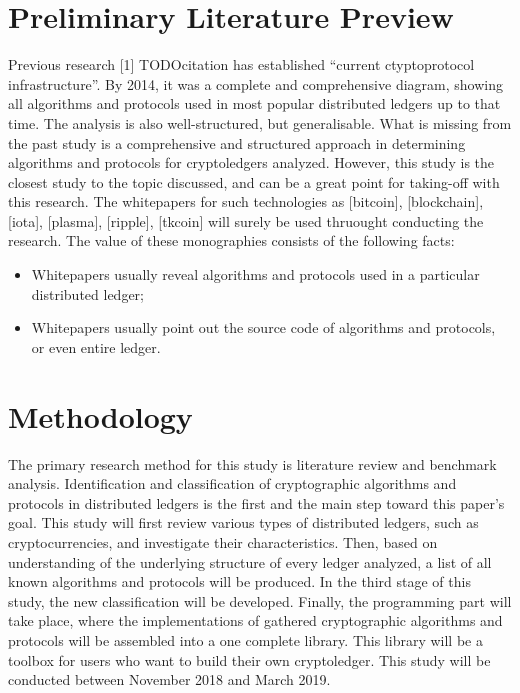 \documentclass[12pt]{article}
\begin{document}
\section{Preliminary Literature Preview}
Previous research [1] TODOcitation has established ``current ctyptoprotocol
infrastructure''. By 2014, it was a complete and comprehensive diagram, showing
all algorithms and protocols used in most popular distributed ledgers up to
that time. The analysis is also well-structured, but generalisable. What is
missing from the past study is a comprehensive and structured approach
in determining algorithms and protocols for cryptoledgers analyzed. However,
this study is the closest study to the topic discussed, and can be a great
point for taking-off with this research. The whitepapers for such technologies
as [bitcoin], [blockchain], [iota], [plasma], [ripple], [tkcoin] will surely be
used thruought conducting the research. The value of these monographies
consists of the following facts:
\begin{itemize}
    \item Whitepapers usually reveal algorithms and protocols used in a
          particular distributed ledger;
    \item Whitepapers usually point out the source code of algorithms and
          protocols, or even entire ledger.
\end{itemize}

\section{Methodology}
The primary research method for this study is literature review and benchmark
analysis. Identification and classification of cryptographic algorithms and
protocols in distributed ledgers is the first and the main step toward this
paper's goal. This study will first review various types of distributed
ledgers, such as cryptocurrencies, and investigate their characteristics. Then,
based on understanding of the underlying structure of every ledger analyzed, a
list of all known algorithms and protocols will be produced. In the third stage
of this study, the new classification will be developed. Finally, the
programming part will take place, where the implementations of gathered
cryptographic algorithms and protocols will be assembled into a one complete
library. This library will be a toolbox for users who want to build their own
cryptoledger. This study will be conducted between November 2018 and March 2019.
\end{document}
